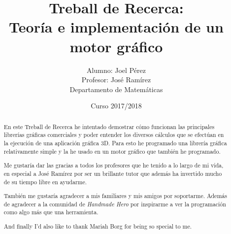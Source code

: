 \documentclass[12pt, a4paper]{report}
\title{Treball de Recerca:\\Teoría e implementación de un motor gráfico}
\date{Curso 2017/2018}
\author{Alumno: Joel Pérez\\Profesor: José Ramírez\\Departamento de Matemáticas}
\begin{document}
\lstset{language=C, basicstyle=\ttfamily}

\maketitle


\newpage


\begin{abstract}
  En este Treball de Recerca he intentado demostrar cómo funcionan las principales librerías gráficas comerciales y poder entender los diversos cálculos que se efectúan en la ejecución de una aplicación gráfica 3D. Para esto he programado una librería gráfica relativamente simple y la he usado en un motor gráfico que también he programado.
\end{abstract}

\renewcommand{\abstractname}{Agradecimientos}
\begin{abstract}
  Me gustaría dar las gracias a todos los profesores que he tenido a lo largo de mi vida, en especial a José Ramírez por ser un brillante tutor que además ha invertido mucho de su tiempo libre en ayudarme.

  También me gustaría agradecer a mis familiares y mis amigos por soportarme. Además de agradecer a la comunidad de \textit{Handmade Hero} por inspirarme a ver la programación como algo más que una herramienta.

  And finally I'd also like to thank Mariah Borg for being so special to me.
\end{abstract}

\tableofcontents
















\end{document}
